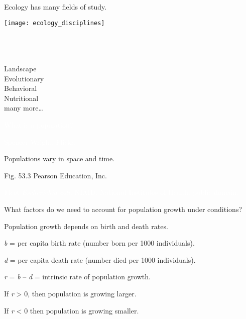 \documentclass[t]{beamer}
\begin{document}
%
\begin{frame}[t]{Ecology has many fields of study.}
	\begin{minipage}[t]{0.6\textwidth}
		\vspace{0pt}
		\texttt{[image: ecology\_disciplines]}
	\end{minipage}
	\hfill
	\begin{minipage}[t]{0.3\textwidth}
		\vspace{0pt}
		\\
		\\
		\\
		Landscape\\
		Evolutionary\\
		Behavioral\\
		Nutritional\\
		many more\dots
	\end{minipage}	
\end{frame}
%
{
\begin{frame}[b]{\textcolor{white}{What is a population?}}

	\tiny\textcolor{white}{Spencer Wright, Flickr, .}
\end{frame}
}
%
{
\begin{frame}[b]{Populations vary in space and time.}

	\hfill \tiny Fig. 53.3 \textcopyright Pearson Education, Inc.
\end{frame}
}
%
{
\begin{frame}[b]{\textcolor{white}{Meet \textit{Escherichia coli.}}}
	\tiny \hfill \textcolor{white}{NIAID, National Institutes of Health, public domain.}%
\end{frame}
}
%
\begin{frame}{}
	\hangpara\Large What factors do we need to account for population growth under  conditions? 
\end{frame}
%
\begin{frame}{Population growth depends on birth and death rates.}

	\hangpara \textit{b} = per capita birth rate (number born per 1000 individuals). \pause
	
	\hangpara \textit{d} = per capita death rate (number died per 1000 individuals). \pause
	
	\hangpara \textit{r} = \textit{b} – \textit{d} = intrinsic rate of population growth. \pause
	
	\hangpara If \textit{r} \textgreater{} 0, then population is growing larger.
	
	\hangpara If \textit{r} \textless{} 0 then population is growing smaller.
	
	
\end{frame}
\end{document}
